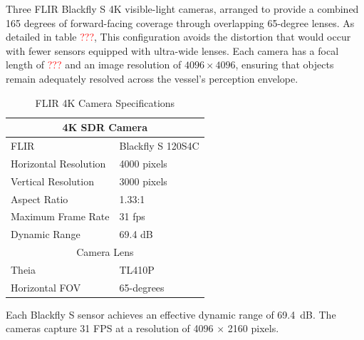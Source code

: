 \documentclass{erauthesis}
\begin{document}
Three FLIR Blackfly S 4K visible-light cameras, arranged to provide a combined 165 degrees of forward-facing coverage through overlapping 65-degree lenses.  
As detailed in table \textcolor{red}{???}, This configuration avoids the distortion that would occur with fewer sensors equipped with ultra-wide lenses.
Each camera has a focal length of \textcolor{red}{???} and an image resolution of $4096 \times 4096$, ensuring that objects remain adequately resolved across the vessel's perception envelope.  
\begin{table}[htbp]
\centering
\caption{FLIR 4K Camera Specifications}
\begin{tabular}{ll}
\hline
\multicolumn{2}{c}{4K SDR Camera}\\
\hline
\hline
FLIR & Blackfly S 120S4C \\
Horizontal Resolution & 4000 pixels \\
Vertical Resolution & 3000 pixels \\
Aspect Ratio & 1.33:1 \\
Maximum Frame Rate & 31 fps \\
Dynamic Range & 69.4 dB \\
\multicolumn{2}{c}{Camera Lens}\\
\hline
Theia & TL410P\\
Horizontal \Ac{FOV} & 65-degrees\\
\hline
\end{tabular}
\label{tab:SDR_camera_specs}
\end{table}

Each Blackfly S sensor achieves an effective dynamic range of 69.4~dB.  
The cameras capture 31 \ac{FPS} at a resolution of 4096 $\times$ 2160 pixels.
\end{document}
